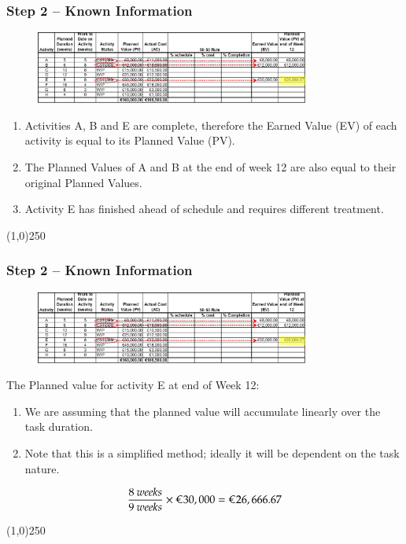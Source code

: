 \begin{frame}
\frametitle{Step 2 – Known Information}
\begin{figure}
	\centering
		\includegraphics[width = 9cm]{images/evmknown.jpg}
	\label{fig:evmknown}
\end{figure}

\begin{enumerate}
	\item Activities A, B and E are complete, therefore the Earned Value (EV) of each activity is equal to its Planned Value (PV).
	\item The Planned Values of A and B at the end of week 12 are also equal to their original Planned Values.
	\item Activity E has finished ahead of schedule and requires different treatment.
\end{enumerate}
\end{frame}
\begin{center}\line(1,0){250}\end{center}


\begin{frame}
\frametitle{Step 2 – Known Information}
\begin{figure}
	\centering
		\includegraphics[width = 9cm]{images/evmknown.jpg}
	\label{fig:evmknown}
\end{figure}
The Planned value for activity E at end of Week 12:
\begin{enumerate}
	\item We are assuming that the planned value will accumulate linearly over the task duration.
	\item Note that this is a simplified method; ideally it will be dependent on the task nature.
\end{enumerate}
\[
\frac{8 \: weeks}{9 \: weeks} \times \text{\euro}30,000 = \text{\euro}26,666.67
\]
\end{frame}
\begin{center}\line(1,0){250}\end{center}




